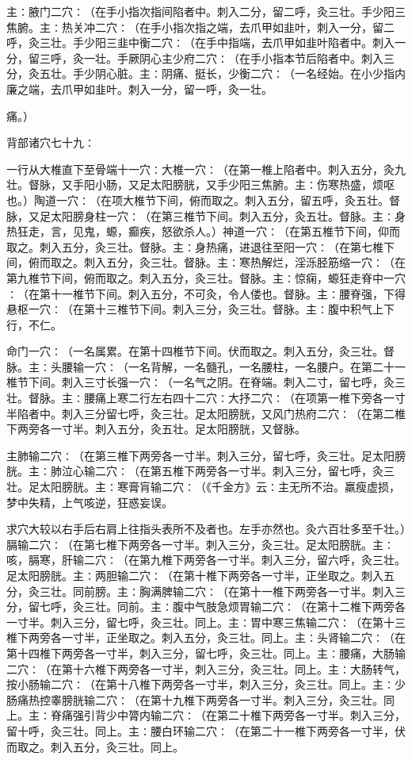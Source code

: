 \documentclass[a4paper,12pt,UTF8,twoside]{ctexbook}
\begin{document}
主∶腋门二穴∶（在手小指次指间陷者中。刺入二分，留二呼，灸三壮。手少阳三焦腑。主∶热关冲二穴∶（在手小指次指之端，去爪甲如韭叶，刺入一分，留二呼，灸三壮。手少阳三韭中衡二穴∶（在手中指端，去爪甲如韭叶陷者中。刺入一分，留三呼，灸一壮。手厥阴心主少府二穴∶（在手小指本节后陷者中。刺入三分，灸五壮。手少阴心脏。主∶阴痛、挺长，少衡二穴∶（一名经始。在小少指内廉之端，去爪甲如韭叶。刺入一分，留一呼，灸一壮。

痛。）

背部诸穴七十九∶

一行从大椎直下至骨端十一穴∶大椎一穴∶（在第一椎上陷者中。刺入五分，灸九壮。督脉，又手阳小肠，又足太阳膀胱，又手少阳三焦腑。主∶伤寒热盛，烦呕也。）陶道一穴∶（在项大椎节下间，俯而取之。刺入五分，留五呼，灸五壮。督脉，又足太阳膀身柱一穴∶（在第三椎节下间。刺入五分，灸五壮。督脉。主∶身热狂走，言，见鬼，螈，癫疾，怒欲杀人。）神道一穴∶（在第五椎节下间，仰而取之。刺入五分，灸三壮。督脉。主∶身热痛，进退往至阳一穴∶（在第七椎下间，俯而取之。刺入五分，灸三壮。督脉。主∶寒热解烂，淫泺胫筋缩一穴∶（在第九椎节下间，俯而取之。刺入五分，灸三壮。督脉。主∶惊痫，螈狂走脊中一穴∶（在第十一椎节下间。刺入五分，不可灸，令人偻也。督脉。主∶腰脊强，下得悬枢一穴∶（在第十三椎节下间。刺入三分，灸三壮。督脉。主∶腹中积气上下行，不仁。

命门一穴∶（一名属累。在第十四椎节下间。伏而取之。刺入五分，灸三壮。督脉。主∶头腰输一穴∶（一名背解，一名髓孔，一名腰柱，一名腰户。在第二十一椎节下间。刺入三寸长强一穴∶（一名气之阴。在脊端。刺入二寸，留七呼，灸三壮。督脉。主∶腰痛上寒二行左右四十二穴∶大抒二穴∶（在项第一椎下旁各一寸半陷者中。刺入三分留七呼，灸三壮。足太阳膀胱，又风门热府二穴∶（在第二椎下两旁各一寸半。刺入五分，灸五壮。足太阳膀胱，又督脉。

主肺输二穴∶（在第三椎下两旁各一寸半。刺入三分，留七呼，灸三壮。足太阳膀胱。主∶肺泣心输二穴∶（在第五椎下两旁各一寸半。刺入三分，留七呼，灸三壮。足太阳膀胱。主∶寒膏肓输二穴∶（《千金方》云∶主无所不治。羸瘦虚损，梦中失精，上气咳逆，狂惑妄误。

求穴大较以右手后右肩上往指头表所不及者也。左手亦然也。灸六百壮多至千壮。）膈输二穴∶（在第七椎下两旁各一寸半。刺入三分，灸三壮。足太阳膀胱。主∶咳，膈寒，肝输二穴∶（在第九椎下两旁各一寸半。刺入三分，留六呼，灸三壮。足太阳膀胱。主∶两胆输二穴∶（在第十椎下两旁各一寸半，正坐取之。刺入五分，灸三壮。同前膀。主∶胸满脾输二穴∶（在第十一椎下两旁各一寸半。刺入三分，留七呼，灸三壮。同前。主∶腹中气肢急烦胃输二穴∶（在第十二椎下两旁各一寸半。刺入三分，留七呼，灸三壮。同上。主∶胃中寒三焦输二穴∶（在第十三椎下两旁各一寸半，正坐取之。刺入五分，灸三壮。同上。主∶头肾输二穴∶（在第十四椎下两旁各一寸半，刺入三分，留七呼，灸三壮。同上。主∶腰痛，大肠输二穴∶（在第十六椎下两旁各一寸半，刺入三分，灸三壮。同上。主∶大肠转气，按小肠输二穴∶（在第十八椎下两旁各一寸半，刺入三分，灸三壮。同上。主∶少肠痛热控睾膀胱输二穴∶（在第十九椎下两旁各一寸半。刺入三分，灸三壮。同上。主∶脊痛强引背少中膂内输二穴∶（在第二十椎下两旁各一寸半。刺入三分，留十呼，灸三壮。同上。主∶腰白环输二穴∶（在第二十一椎下两旁各一寸半，伏而取之。刺入五分，灸三壮。同上。
\end{document}
